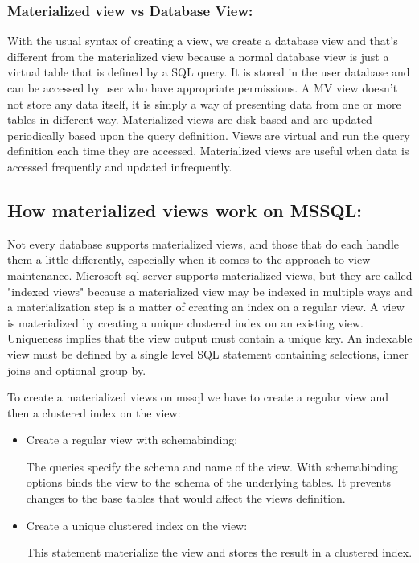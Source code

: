 \subsubsection{Materialized view vs Database View:} With the usual syntax of creating a view, we create a database view  and that's different from the materialized view because a normal database view is just a virtual table that is defined by a SQL query. It is stored in the user database and can be accessed by user who have appropriate permissions. A MV view doesn't not store any data itself, it is simply  a way of presenting data from one  or more tables in different way. Materialized views are disk based and are updated periodically based upon the query definition.\cite{Stackoverflow-author-08-2008} Views are virtual and run the query definition each time they are accessed. Materialized views are useful when data is accessed frequently and updated infrequently.


 \subsection{ How materialized views work on MSSQL:} Not every database supports materialized views, and those that do each handle them a little differently, especially when it comes to the approach to view maintenance.\cite{hattemer-2020} Microsoft sql server supports materialized views, but they are called "indexed views" because a materialized view may be indexed in multiple ways and a materialization step is a matter of creating an index on a regular view. A view is materialized by creating a unique clustered index on an existing view. Uniqueness implies that the view output must contain a unique key. An indexable view must be defined by a single level SQL statement containing selections, inner joins and optional group-by.\cite{goldstein-2001}\vspace{0.8cm}

 To create a materialized views on mssql we have to create a  regular view and then a clustered index on the view:
 \begin{itemize}
     \item {Create a regular view with schemabinding:}\vspace{0.4cm}
     

The queries specify the schema and name of the view. With schemabinding options binds the view to the schema of the underlying tables. It prevents changes to the base tables that would affect the views definition.
      \item {Create a unique clustered index on the view:}\vspace{0.4cm}
      
 \vspace{0.4cm}

This statement materialize the view and stores the result in a clustered index.
\end{itemize}



